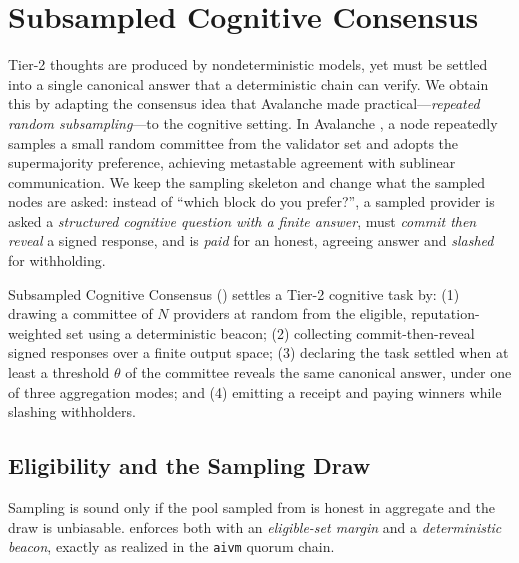 \section{Subsampled Cognitive Consensus}
\label{sec:scc}

Tier-2 thoughts are produced by nondeterministic models, yet must be settled into a single canonical answer that a deterministic chain can verify. We obtain this by adapting the consensus idea that Avalanche made practical---\emph{repeated random subsampling}---to the cognitive setting. In Avalanche \cite{avalanche2020,rocket2018}, a node repeatedly samples a small random committee from the validator set and adopts the supermajority preference, achieving metastable agreement with sublinear communication. We keep the sampling skeleton and change what the sampled nodes are asked: instead of ``which block do you prefer?'', a sampled provider is asked a \emph{structured cognitive question with a finite answer}, must \emph{commit then reveal} a signed response, and is \emph{paid} for an honest, agreeing answer and \emph{slashed} for withholding.

\begin{definition}
\label{def:scc}
Subsampled Cognitive Consensus (\SCC{}) settles a Tier-2 cognitive task by: (1) drawing a committee of $N$ providers at random from the eligible, reputation-weighted set using a deterministic beacon; (2) collecting commit-then-reveal signed responses over a finite output space; (3) declaring the task settled when at least a threshold $\theta$ of the committee reveals the same canonical answer, under one of three aggregation modes; and (4) emitting a \PoT{} receipt and paying winners while slashing withholders.
\end{definition}

\subsection{Eligibility and the Sampling Draw}

Sampling is sound only if the pool sampled from is honest in aggregate and the draw is unbiasable. \SCC{} enforces both with an \emph{eligible-set margin} and a \emph{deterministic beacon}, exactly as realized in the \texttt{aivm} quorum chain.

